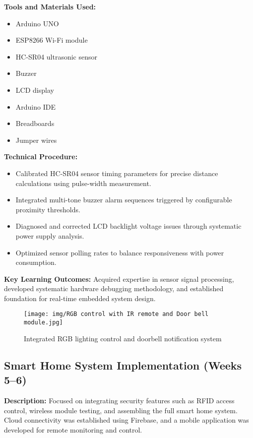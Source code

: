 \documentclass[12pt,a4paper]{report}
\begin{document}
\noindent\textbf{Tools and Materials Used:}
\begin{multicols}{2}
\begin{itemize}
    \item Arduino UNO
    \item ESP8266 Wi-Fi module
    \item HC-SR04 ultrasonic sensor
    \item Buzzer
    \item LCD display
    \item Arduino IDE
    \item Breadboards
    \item Jumper wires
\end{itemize}
\end{multicols}

\noindent\textbf{Technical Procedure:}
\begin{itemize}
    \item Calibrated HC-SR04 sensor timing parameters for precise distance calculations using pulse-width measurement.
    \item Integrated multi-tone buzzer alarm sequences triggered by configurable proximity thresholds.
    \item Diagnosed and corrected LCD backlight voltage issues through systematic power supply analysis.
    \item Optimized sensor polling rates to balance responsiveness with power consumption.
\end{itemize}

\noindent\textbf{Key Learning Outcomes:} Acquired expertise in sensor signal processing, developed systematic hardware debugging methodology, and established foundation for real-time embedded system design.

\begin{figure}[H]
\centering
\texttt{[image: img/RGB control with IR remote and Door bell module.jpg]}
\caption{Integrated RGB lighting control and doorbell notification system}
\label{fig:rgb-doorbell}
\end{figure}

\subsection{Smart Home System Implementation (Weeks 5--6)}

\noindent\textbf{Description:} Focused on integrating security features such as RFID access control, wireless module testing, and assembling the full smart home system. Cloud connectivity was established using Firebase, and a mobile application was developed for remote monitoring and control.
\end{document}
